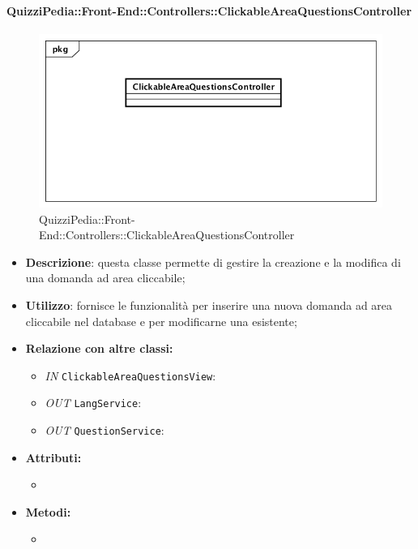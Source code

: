 \paragraph{QuizziPedia::Front-End::Controllers::ClickableAreaQuestionsController}
\begin{figure}
	\centering
	\includegraphics[scale=0.45]{UML/Classi/Front-End/QuizziPedia_Front-end_Controller_ClickableAreaQuestionsController.png}
	\caption{QuizziPedia::Front-End::Controllers::ClickableAreaQuestionsController}
\end{figure}
\begin{itemize}
	\item \textbf{Descrizione}: questa classe permette di gestire la creazione e la modifica di una domanda ad area cliccabile;
	\item \textbf{Utilizzo}: fornisce le funzionalità per inserire una nuova domanda ad area cliccabile nel database e per modificarne una esistente;
	\item \textbf{Relazione con altre classi:}
	\begin{itemize}
		\item \textit{IN} \texttt{ClickableAreaQuestionsView}:  
		\item \textit{OUT} \texttt{LangService}: 
		\item \textit{OUT} \texttt{QuestionService}:
	\end{itemize}
	\item \textbf{Attributi:}
	\begin{itemize}
		\item 
	\end{itemize}
	\item \textbf{Metodi:}
	\begin{itemize}
		\item 
	\end{itemize}
\end{itemize}

